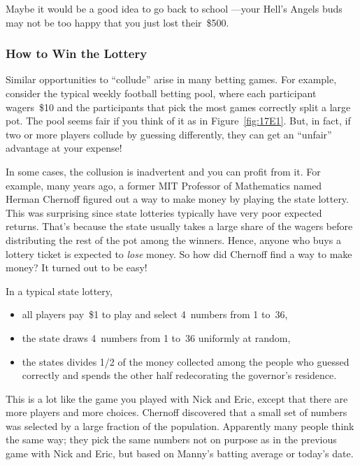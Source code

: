 Maybe it would be a good idea to go back to school ---your Hell's
Angels buds may not be too happy that you just lost their~\$500.

\subsubsection{How to Win the Lottery}

Similar opportunities to ``collude'' arise in many betting games.
For example, consider the typical weekly football betting pool, where
each participant wagers~\$10 and the participants that pick the most
games correctly split a large pot.  The pool seems fair if you think
of it as in Figure~\ref{fig:17E1}.  But, in fact, if two or more
players collude by guessing differently, they can get an
``unfair'' advantage at your expense!

In some cases, the collusion is inadvertent and you can profit
from it.  For example, many years ago, a former MIT Professor of
Mathematics named Herman Chernoff figured out a way to make money by
playing the state lottery.  This was surprising since state lotteries
typically have very poor expected returns.  That's because the state
usually takes a large share of the wagers before distributing the rest
of the pot among the winners.  Hence, anyone who buys a lottery ticket
is expected to \emph{lose} money.  So how did Chernoff find a way to
make money?  It turned out to be easy!

In a typical state lottery,
\begin{itemize}

\item all players pay~\$1 to play and select 4~numbers from 1 to~36,

\item the state draws 4~numbers from 1 to~36 uniformly at random,

\item the states divides 1/2 of the money collected among the people
  who guessed correctly and spends the other half redecorating the
  governor's residence.

\end{itemize}
This is a lot like the game you played with Nick and Eric, except that
there are more players and more choices.  Chernoff discovered that a
small set of numbers was selected by a large fraction of the
population.  Apparently many people think the same way; they pick the
same numbers not on purpose as in the previous game with Nick and
Eric, but based on Manny's batting average or today's date.

